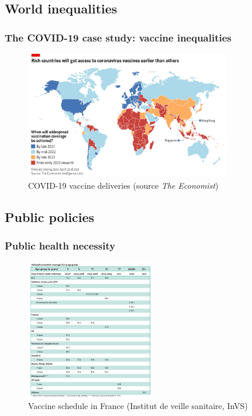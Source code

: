 \subsection{World inequalities}

\begin{frame}
    \frametitle{The COVID-19 case study: vaccine inequalities}
    \begin{figure}
        \centering
        \includegraphics[width=0.8\textwidth]{imgs/Inequalities.png}
        \caption{COVID-19 vaccine deliveries (source \emph{The Economist})}
        \label{fig:responses6}
    \end{figure}
\end{frame}

\subsection{Public policies}


\begin{frame}
    \frametitle{Public health necessity}
    \begin{figure}
        \centering
        \includegraphics[width=0.5\textwidth]{imgs/VaccineSchedule.JPG}
        \caption{Vaccine schedule in France (Institut de veille sanitaire, InVS) \autocite{spfAssessmentVaccinationCoverage}}
        \label{fig:responses7}
    \end{figure}
\end{frame}

